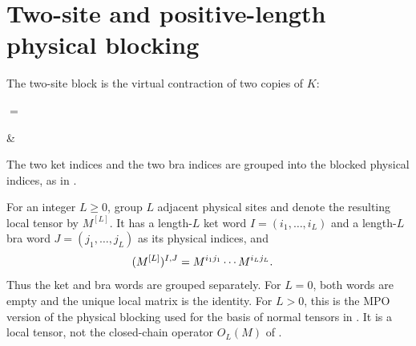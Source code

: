 \section{Two-site and positive-length physical blocking}

The two-site block is the virtual contraction of two copies of $K$:
\begin{tenkzequation}
    \tenkzkernel
    \begin{tenkz}[rows={wire}, cols=1, west=open, east=open]
    \end{tenkz}
    \qquad$=$\qquad
    \begin{tenkz}[rows={wire}, cols=2, west=open, east=open]
         &
    \end{tenkz}
\end{tenkzequation}
The two ket indices and the two bra indices are grouped into the blocked
physical indices, as in
\cite[Theorem~4.9, lines~851--856]{Cirac2016MPDO_arXiv}.

\begin{definition}
    \label{def:mpdo_physical_blocking}
    \leanok
    For an integer $L\geq0$, group $L$ adjacent physical sites and denote
    the resulting local tensor by $M^{[L]}$. It has a length-$L$ ket word
    $I=(i_1,\ldots,i_L)$ and a length-$L$ bra word
    $J=(j_1,\ldots,j_L)$ as its physical indices, and
    \begin{align}
        (M^{[L]})^{I,J}
         & =M^{i_1j_1}\cdots M^{i_Lj_L}.
        \notag
    \end{align}
    Thus the ket and bra words are grouped separately. For $L=0$, both
    words are empty and the unique local matrix is the identity. For $L>0$,
    this is the MPO version of the physical blocking used for the basis of
    normal tensors in
    \cite[lines~317--345]{Cirac2016MPDO_arXiv}. It is a local tensor, not the
    closed-chain operator $O_L(M)$ of
    \cite[lines~962--967]{Cirac2016MPDO_arXiv}.
\end{definition}

